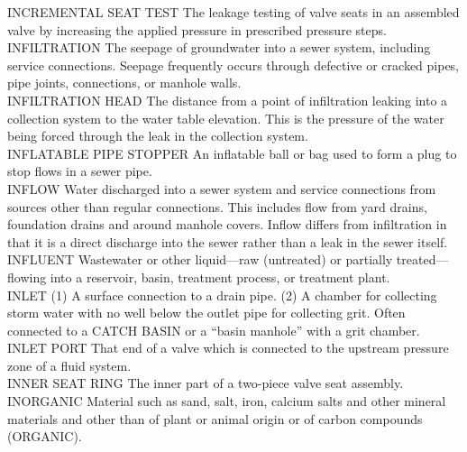 \documentclass{article}
\begin{document}
INCREMENTAL SEAT TEST
The leakage testing of valve seats in an assembled valve by increasing the applied pressure in prescribed pressure steps.
\vspace{0.3cm}\\
INFILTRATION
The seepage of groundwater into a sewer system, including service connections. Seepage frequently occurs through defective or cracked pipes, pipe joints, connections, or manhole walls. 
\vspace{0.3cm}\\
INFILTRATION HEAD
The distance from a point of infiltration leaking into a collection system to the water table elevation. This is the pressure of the water being forced through the leak in the collection system. 
\vspace{0.3cm}\\
INFLATABLE PIPE STOPPER
An inflatable ball or bag used to form a plug to stop flows in a sewer pipe. 
\vspace{0.3cm}\\
INFLOW
Water discharged into a sewer system and service connections from sources other than regular connections. This includes flow from yard drains, foundation drains and around manhole covers. Inflow differs from infiltration in that it is a direct discharge into the sewer rather than a leak in the sewer itself.
\vspace{0.3cm}\\
INFLUENT
Wastewater or other liquid—raw (untreated) or partially treated—flowing into a reservoir, basin, treatment process, or treatment plant. 
\vspace{0.3cm}\\
INLET
(1) A surface connection to a drain pipe. (2) A chamber for collecting storm water with no well below the outlet pipe for collecting grit. Often connected to a CATCH BASIN or a “basin manhole” with a grit chamber. 
\vspace{0.3cm}\\
INLET PORT
That end of a valve which is connected to the upstream pressure zone of a fluid system.
\vspace{0.3cm}\\
INNER SEAT RING
The inner part of a two-piece valve seat assembly.
\vspace{0.3cm}\\
INORGANIC
Material such as sand, salt, iron, calcium salts and other mineral materials and other than of plant or animal origin or of carbon compounds (ORGANIC).
\vspace{0.3cm}\\
\end{document}
